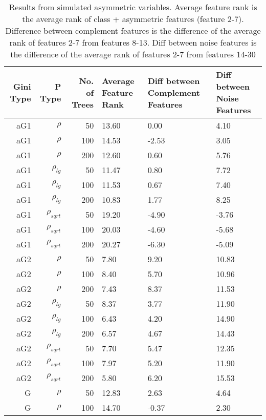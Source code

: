 \begin{table}%
  \centering
  \caption{Results from simulated asymmetric variables. Average feature rank is the average rank of class + asymmetric features (feature 2-7). Difference between complement features is the difference of the average rank of features 2-7 from features 8-13. Diff between noise features is the difference of the average rank of features 2-7 from features 14-30}
\begin{tabular}{rrrp{2.5cm}p{2.5cm}p{2.5cm}}
\hline
Gini Type & P Type & No. of Trees & Average Feature Rank & Diff between Complement Features & Diff between Noise Features \bigstrut\\
\hline
\renewcommand{\arraystretch}{.5}
aG1   & $\rho$ & 50    & 13.60 & 0.00  & 4.10 \bigstrut[t]\\
aG1   & $\rho$ & 100   & 14.53 & -2.53 & 3.05 \\
aG1   & $\rho$ & 200   & 12.60 & 0.60  & 5.76 \\
aG1   & $\rho_{lg}$ & 50    & 11.47 & 0.80  & 7.72 \\
aG1   & $\rho_{lg}$ & 100   & 11.53 & 0.67  & 7.40 \\
aG1   & $\rho_{lg}$ & 200   & 10.83 & 1.77  & 8.25 \\
aG1   & $\rho_{sqrt}$ & 50    & 19.20 & -4.90 & -3.76 \\
aG1   & $\rho_{sqrt}$ & 100   & 20.03 & -4.60 & -5.68 \\
aG1   & $\rho_{sqrt}$ & 200   & 20.27 & -6.30 & -5.09 \\
aG2   & $\rho$ & 50    & 7.80  & 9.20  & 10.83 \\
aG2   & $\rho$ & 100   & 8.40  & 5.70  & 10.96 \\
aG2   & $\rho$ & 200   & 7.43  & 8.37  & 11.53 \\
aG2   & $\rho_{lg}$ & 50    & 8.37  & 3.77  & 11.90 \\
aG2   & $\rho_{lg}$ & 100   & 6.43  & 4.20  & 14.90 \\
aG2   & $\rho_{lg}$ & 200   & 6.57  & 4.67  & 14.43 \\
aG2   & $\rho_{sqrt}$ & 50    & 7.70  & 5.47  & 12.35 \\
aG2   & $\rho_{sqrt}$ & 100   & 7.97  & 5.20  & 11.90 \\
aG2   & $\rho_{sqrt}$ & 200   & 5.80  & 6.20  & 15.53 \\
G     & $\rho$ & 50    & 12.83 & 2.63  & 4.64 \\
G     & $\rho$ & 100   & 14.70 & -0.37 & 2.30 \\

\end{tabular}
\end{table}
